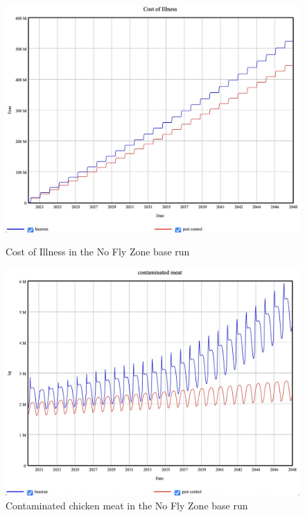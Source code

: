 \begin{figure}[h!]
    \centering
    \begin{minipage}{0.45\textwidth}
        \centering
        \includegraphics[width=1\textwidth]{images/p3_coi.jpeg} 
        \caption{Cost of Illness in the No Fly Zone base run}
        \label{fig:p3_coi}
    \end{minipage}\hfill
    \begin{minipage}{0.45\textwidth}
        \centering
        \includegraphics[width=1\textwidth]{images/p3_meat.jpeg}
        \caption{Contaminated chicken meat in the No Fly Zone base run}
        \label{fig:p3_meat}
    \end{minipage}
\end{figure} 

